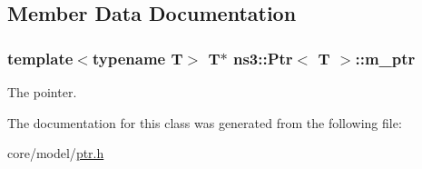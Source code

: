 \subsection{Member Data Documentation}
\subsubsection[{\texorpdfstring{m\+\_\+ptr}{m_ptr}}]{\setlength{\rightskip}{0pt plus 5cm}template$<$typename T$>$ T$\ast$ {\bf ns3\+::\+Ptr}$<$ T $>$\+::m\+\_\+ptr\hspace{0.3cm}{\ttfamily [private]}}\hypertarget{classns3_1_1Ptr_af48a617408c972186d97c7e1ac4d5652}{}\label{classns3_1_1Ptr_af48a617408c972186d97c7e1ac4d5652}
The pointer. 

The documentation for this class was generated from the following file\+:\begin{DoxyCompactItemize}
\item 
core/model/\hyperlink{ptr_8h}{ptr.\+h}\end{DoxyCompactItemize}

